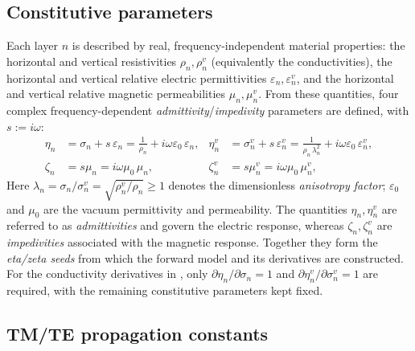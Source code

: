\documentclass[12pt]{report}
\begin{document}
\subsection{Constitutive parameters}
\label{sec:constitutive}

Each layer \(n\) is described by real, frequency-independent material
properties: the horizontal and vertical resistivities
\(\rho_n,\rho_n^v\) (equivalently the conductivities), the horizontal and
vertical relative electric permittivities
\(\varepsilon_n,\varepsilon_n^v\), and the horizontal and vertical relative
magnetic permeabilities \(\mu_n,\mu_n^v\). From these quantities, four
complex frequency-dependent \emph{admittivity}/\emph{impedivity}
parameters are defined, with \(s:=i\omega\):
\begin{align}
    \eta_n   &= \sigma_n + s\,\varepsilon_n
             = \frac{1}{\rho_n} + i\omega\varepsilon_0\,\varepsilon_n,
             &\eta^v_n  &= \sigma^v_n + s\,\varepsilon^v_n
             = \frac{1}{\rho_n\,\lambda_n^2} + i\omega\varepsilon_0\,\varepsilon^v_n,
    \label{eq:eta-def} \\
    \zeta_n  &= s\mu_n = i\omega\mu_0\,\mu_n,
             &\zeta^v_n &= s\mu^v_n = i\omega\mu_0\,\mu^v_n,
    \label{eq:zeta-def}
\end{align}
Here \(\lambda_n=\sigma_n/\sigma_n^v=\sqrt{\rho_n^v/\rho_n}\geq1\)
denotes the dimensionless \emph{anisotropy factor};
\(\varepsilon_0\) and \(\mu_0\) are the vacuum permittivity and
permeability. The quantities \(\eta_n,\eta_n^v\) are referred to as
\emph{admittivities} and govern the electric response, whereas
\(\zeta_n,\zeta_n^v\) are \emph{impedivities} associated with the magnetic
response. Together they form the \emph{eta/zeta seeds} from which the
forward model and its derivatives are constructed. For the conductivity
derivatives in , only
\(\partial\eta_n/\partial\sigma_n=1\) and
\(\partial\eta_n^v/\partial\sigma_n^v=1\) are required, with the remaining
constitutive parameters kept fixed.

\subsection{TM/TE propagation constants}
\label{sec:propagation-constants}
\end{document}
